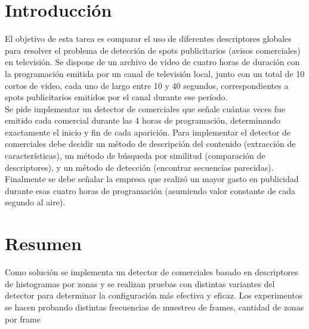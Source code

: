 \documentclass[14pt,letterpaper,hidelinks]{extarticle}
\begin{document}

\renewcommand{\sectionmark}[1]{\markright{\thesection.\ #1}}
\renewcommand{\headrulewidth}{0.5pt}

%
\tableofcontents
\listoffigures
\listoftables

\newpage
\section{Introducción}
El objetivo de esta tarea es comparar el uso de diferentes descriptores globales para resolver el problema de detección de spots publicitarios (avisos comerciales) en televisión. 
Se dispone de un archivo de video de cuatro horas de duración con la programación emitida por un canal de televisión local, junto con un total de 10 cortos de video, cada uno de largo entre 10 y 40 segundos, correspondientes a spots publicitarios emitidos por el canal durante ese período.\\

Se pide implementar un detector de comerciales que señale cuántas veces fue emitido cada comercial durante las 4 horas de programación, determinando exactamente el inicio y
fin de cada aparición. Para implementar el detector de comerciales debe decidir un método de 
descripción del contenido (extracción de características), un método de búsqueda
por similitud (comparación de descriptores), y un método de detección (encontrar
secuencias parecidas).\\

Finalmente se debe señalar la empresa que realizó un mayor gasto en publicidad durante esas cuatro horas de programación (asumiendo valor constante de cada segundo al aire).  
\section{Resumen}
Como solución se implementa un detector de comerciales basado en descriptores de histogramas por zonas y se realizan pruebas con distintas variantes del detector para determinar la configuración más efectiva y eficaz. Los experimentos se hacen probando distintas frecuencias de muestreo de frames, cantidad de zonas por frame
  
\end{document}
